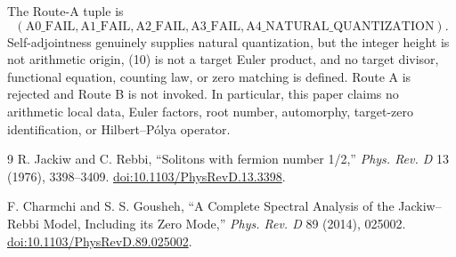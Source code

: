 \documentclass[10pt]{article}
\theoremstyle{remark}
\begin{document}
The Route-A tuple is
\[
 (\mathrm{A0\_FAIL},\mathrm{A1\_FAIL},\mathrm{A2\_FAIL},
   \mathrm{A3\_FAIL},\mathrm{A4\_NATURAL\_QUANTIZATION}).
\]
Self-adjointness genuinely supplies natural quantization, but the integer
height is not arithmetic origin, (10) is not a target Euler product, and no
target divisor, functional equation, counting law, or zero matching is
defined.  Route A is rejected and Route B is not invoked.  In particular,
this paper claims no arithmetic local data, Euler factors, root number,
automorphy, target-zero identification, or Hilbert--P\'olya operator.

\begin{thebibliography}{9}
R. Jackiw and C. Rebbi,
``Solitons with fermion number 1/2,''
\emph{Phys. Rev. D} 13 (1976), 3398--3409.
\href{https://doi.org/10.1103/PhysRevD.13.3398}{doi:10.1103/PhysRevD.13.3398}.

F. Charmchi and S. S. Gousheh,
``A Complete Spectral Analysis of the Jackiw--Rebbi Model, Including its Zero Mode,''
\emph{Phys. Rev. D} 89 (2014), 025002.
\href{https://doi.org/10.1103/PhysRevD.89.025002}{doi:10.1103/PhysRevD.89.025002}.
\end{thebibliography}
\fi
\end{document}
